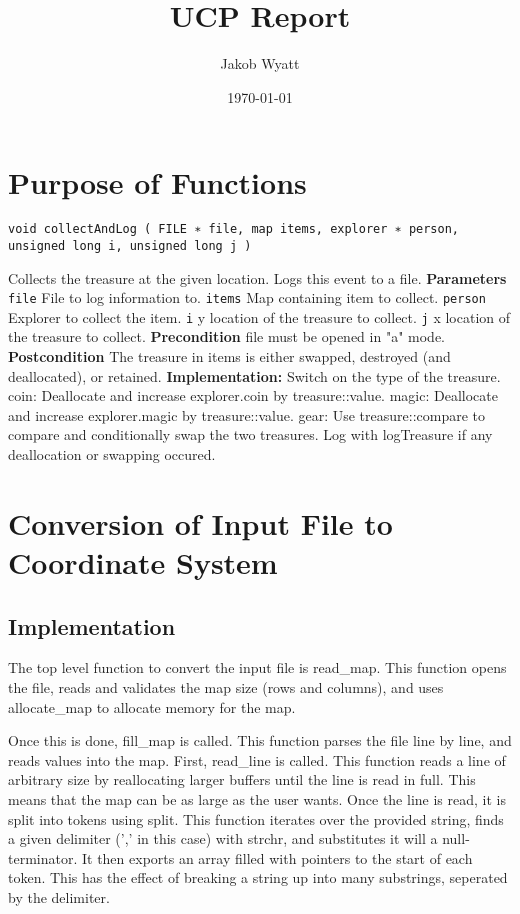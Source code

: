 \documentclass{article}
\title{UCP Report}
\date{\today}
\author{Jakob Wyatt}
\begin{document}
\maketitle
\pagebreak
\tableofcontents
\pagebreak

\section{Purpose of Functions}

\begin{lstlisting}
void collectAndLog ( FILE ∗ file, map items, explorer ∗ person, unsigned long i, unsigned long j )
\end{lstlisting}
Collects the treasure at the given location. Logs this event to a file.
\textbf{Parameters}
\texttt{file} File to log information to.
\texttt{items} Map containing item to collect.
\texttt{person} Explorer to collect the item.
\texttt{i} y location of the treasure to collect.
\texttt{j} x location of the treasure to collect.
\textbf{Precondition}
file must be opened in "a" mode.
\textbf{Postcondition}
The treasure in items is either swapped, destroyed (and deallocated), or retained.
\textbf{Implementation:} Switch on the type of the treasure. coin: Deallocate and increase explorer.coin by
treasure::value. magic: Deallocate and increase explorer.magic by treasure::value. gear: Use treasure::compare
to compare and conditionally swap the two treasures. Log with logTreasure if any deallocation or
swapping occured.


\section{Conversion of Input File to Coordinate System}
\subsection{Implementation}
The top level function to convert the input file is read\_map.
This function opens the file, reads and validates the map size (rows and columns),
and uses allocate\_map to allocate memory for the map.

Once this is done, fill\_map is called.
This function parses the file line by line, and reads values into the map.
First, read\_line is called. This function reads a line of arbitrary size
by reallocating larger buffers until the line is read in full. This means that
the map can be as large as the user wants.
Once the line is read, it is split into tokens using split. This function iterates
over the provided string, finds a given delimiter (',' in this case) with strchr, and substitutes
it will a null-terminator. It then exports an array filled with pointers to the start
of each token. This has the effect of breaking a string up into many substrings, seperated
by the delimiter.
\end{document}
